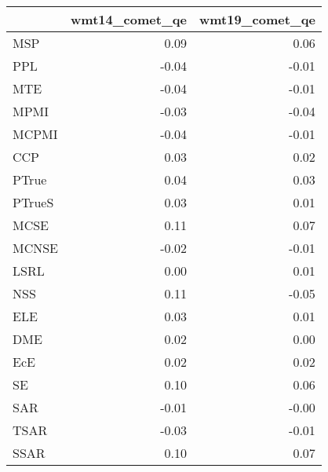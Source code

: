 \begin{tabular}{lrr}
\toprule
 & wmt14\_comet\_qe & wmt19\_comet\_qe \\
\midrule
MSP & 0.09 & 0.06 \\
PPL & -0.04 & -0.01 \\
MTE & -0.04 & -0.01 \\
MPMI & -0.03 & -0.04 \\
MCPMI & -0.04 & -0.01 \\
CCP & 0.03 & 0.02 \\
PTrue & 0.04 & 0.03 \\
PTrueS & 0.03 & 0.01 \\
MCSE & 0.11 & 0.07 \\
MCNSE & -0.02 & -0.01 \\
LSRL & 0.00 & 0.01 \\
NSS & 0.11 & -0.05 \\
ELE & 0.03 & 0.01 \\
DME & 0.02 & 0.00 \\
EcE & 0.02 & 0.02 \\
SE & 0.10 & 0.06 \\
SAR & -0.01 & -0.00 \\
TSAR & -0.03 & -0.01 \\
SSAR & 0.10 & 0.07 \\
\bottomrule
\end{tabular}
